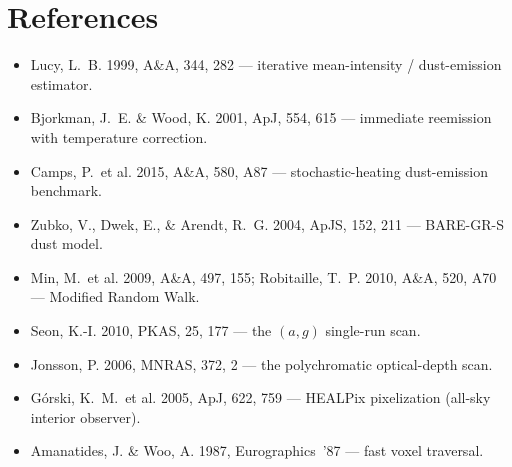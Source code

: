 \documentclass[english,a4paper]{kiseon_memo}
\begin{document}
\section*{References}
\begin{itemize}\small
\item Lucy, L.~B. 1999, A\&A, 344, 282 --- iterative mean-intensity /
      dust-emission estimator.
\item Bjorkman, J.~E. \& Wood, K. 2001, ApJ, 554, 615 --- immediate reemission
      with temperature correction.
\item Camps, P.\ et al. 2015, A\&A, 580, A87 --- stochastic-heating
      dust-emission benchmark.
\item Zubko, V., Dwek, E., \& Arendt, R.~G. 2004, ApJS, 152, 211 ---
      BARE-GR-S dust model.
\item Min, M.\ et al. 2009, A\&A, 497, 155; Robitaille, T.~P. 2010, A\&A, 520,
      A70 --- Modified Random Walk.
\item Seon, K.-I. 2010, PKAS, 25, 177 --- the $(a,g)$ single-run scan.
\item Jonsson, P. 2006, MNRAS, 372, 2 --- the polychromatic optical-depth scan.
\item G\'orski, K.~M.\ et al. 2005, ApJ, 622, 759 --- HEALPix pixelization
      (all-sky interior observer).
\item Amanatides, J. \& Woo, A. 1987, Eurographics~'87 --- fast voxel traversal.
\end{itemize}
\end{document}
